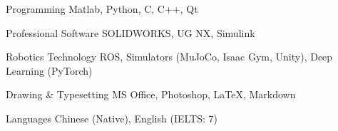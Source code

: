 \vspace{-9mm}
\begin{cvskills}
\cvskill
   {Programming} %
    {Matlab, Python, C, C++, Qt} %

  \cvskill
   {Professional Software} %
   {SOLIDWORKS, UG NX, Simulink} %

  \cvskill
   {Robotics Technology} %
   {ROS, Simulators (MuJoCo, Isaac Gym, Unity), Deep Learning (PyTorch)} %

  \cvskill
{Drawing \& Typesetting} %
{MS Office, Photoshop, \textrm{\LaTeX}, Markdown} %

  \cvskill
   {Languages} %
   {Chinese (Native), English (IELTS: 7)} %
   \vspace{-11mm}
\end{cvskills}
